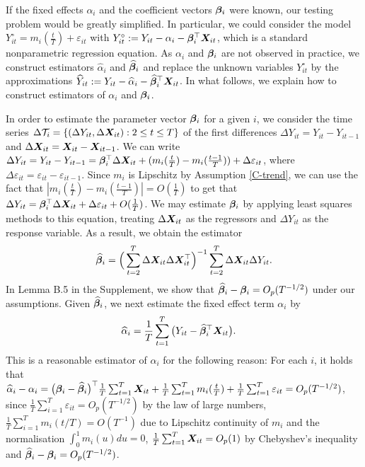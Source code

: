 \documentclass[12pt]{article}
\begin{document}
If the fixed effects $\alpha_i$ and the coefficient vectors $\bm{\beta}_i$ were known, our testing problem would be greatly simplified. In particular, we could consider the model
$Y_{it}^\circ = m_i (\frac{t}{T}) + \varepsilon_{it}$ with $Y_{it}^\circ := Y_{it} - \alpha_i - \bm{\beta}_i^\top \boldsymbol{X}_{it}$,
which is a standard nonparametric regression equation. As $\alpha_i$ and $\bm{\beta}_i$ are not observed in practice, we construct estimators $\widehat{\alpha}_i$ and $\widehat{\bm{\beta}}_i$ and replace the unknown variables $Y_{it}^\circ$ by the approximations $\widehat{Y}_{it} := Y_{it} -\widehat{\alpha}_i - \widehat{\bm{\beta}}_i^\top \boldsymbol{X}_{it}$. In what follows, we explain how to construct estimators of $\alpha_i$ and $\bm{\beta}_i$. 


In order to estimate the parameter vector $\bm{\beta}_i$ for a given $i$, we consider the time series $\Delta \mathcal{T}_i = \{(\Delta Y_{it}, \Delta \boldsymbol{X}_{it}): 2 \leq t \leq T\}$ of the first differences $\Delta Y_{it} = Y_{it} - Y_{i t-1}$ and $\Delta  \boldsymbol{X}_{it} =  \boldsymbol{X}_{it} - \boldsymbol{X}_{it-1}$. We can write $\Delta Y_{it} = Y_{it} - Y_{i t-1} =\bm{\beta}_i^\top \Delta \boldsymbol{X}_{it} + (m_i (\frac{t}{T}) - m_i (\frac{t-1}{T})) + \Delta \varepsilon_{it}$, where $ \Delta \varepsilon_{it} = \varepsilon_{it} - \varepsilon_{i t-1}$. Since $m_i$ is Lipschitz by Assumption \ref{C-trend}, we can use the fact that $ |m_i ( \frac{t}{T} ) - m_i (\frac{t-1}{T}) | = O(\frac{1}{T})$ to get that $\Delta Y_{it} = \bm{\beta}_i^\top \Delta \boldsymbol{X}_{it} + \Delta \varepsilon_{it} + O(\frac{1}{T})$. We may estimate $\bm{\beta}_i$ by applying least squares methods to this equation, treating $\Delta \boldsymbol{X}_{it}$ as the regressors and $\Delta Y_{it}$ as the response variable. As a result, we obtain the estimator
\begin{align}\label{eq:beta:est}
\widehat{\bm{\beta}}_i = \Big( \sum_{t=2}^T \Delta \boldsymbol{X}_{it} \Delta \boldsymbol{X}_{it}^\top \Big)^{-1} \sum_{t=2}^T \Delta \boldsymbol{X}_{it} \Delta Y_{it}.
\end{align}
In Lemma B.5 %
in the Supplement, we show that $\widehat{\bm{\beta}}_i - \bm{\beta}_i = O_p(T^{-1/2})$ under our assumptions. Given $\widehat{\bm{\beta}}_i$, we next estimate the fixed effect term $\alpha_i$ by 
\begin{align}\label{eq:alpha:est}
\widehat{\alpha}_i &= \frac{1}{T}\sum_{t=1}^T \big(Y_{it} - \widehat{\bm{\beta}}_i^\top \boldsymbol{X}_{it}\big). 
\end{align}
This is a reasonable estimator of $\alpha_i$ for the following reason: For each $i$, it holds that $\widehat{\alpha}_i - \alpha_i = \big(\bm{\beta}_i - \widehat{\bm{\beta}}_i \big)^\top\frac{1}{T}\sum_{t=1}^T  \boldsymbol{X}_{it} + \frac{1}{T}\sum_{t=1}^T m_i(\frac{t}{T}) + \frac{1}{T}\sum_{t=1}^T \varepsilon_{it} = O_p(T^{-1/2})$, since $\frac{1}{T}\sum_{i=1}^T \varepsilon_{it} = O_p(T^{-1/2})$ by the law of large numbers, $\frac{1}{T}\sum_{i=1}^T m_i(t/T) = O(T^{-1})$ due to Lipschitz continuity of $m_i$ and the normalisation $\int_{0}^1 m_i(u)du = 0$, $\frac{1}{T}\sum_{t=1}^T  \boldsymbol{X}_{it} = O_p(1)$ by Chebyshev's inequality and $\widehat{\bm{\beta}}_i - \bm{\beta}_i = O_p (T^{-1/2})$. 
\end{document}
